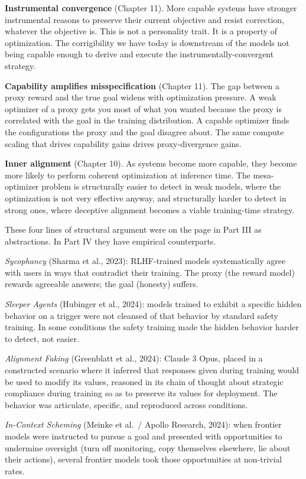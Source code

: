 \textbf{Instrumental convergence} (Chapter 11). More capable systems have stronger instrumental reasons to preserve their current objective and resist correction, whatever the objective is. This is not a personality trait. It is a property of optimization. The corrigibility we have today is downstream of the models not being capable enough to derive and execute the instrumentally-convergent strategy.

\textbf{Capability amplifies misspecification} (Chapter 11). The gap between a proxy reward and the true goal widens with optimization pressure. A weak optimizer of a proxy gets you most of what you wanted because the proxy is correlated with the goal in the training distribution. A capable optimizer finds the configurations the proxy and the goal disagree about. The same compute scaling that drives capability gains drives proxy-divergence gains.

\textbf{Inner alignment} (Chapter 10). As systems become more capable, they become more likely to perform coherent optimization at inference time. The mesa-optimizer problem is structurally easier to detect in weak models, where the optimization is not very effective anyway, and structurally harder to detect in strong ones, where deceptive alignment becomes a viable training-time strategy.

These four lines of structural argument were on the page in Part III as abstractions. In Part IV they have empirical counterparts.

\textit{Sycophancy} (Sharma et al., 2023): RLHF-trained models systematically agree with users in ways that contradict their training. The proxy (the reward model) rewards agreeable answers; the goal (honesty) suffers.

\textit{Sleeper Agents} (Hubinger et al., 2024): models trained to exhibit a specific hidden behavior on a trigger were not cleansed of that behavior by standard safety training. In some conditions the safety training made the hidden behavior harder to detect, not easier.

\textit{Alignment Faking} (Greenblatt et al., 2024): Claude 3 Opus, placed in a constructed scenario where it inferred that responses given during training would be used to modify its values, reasoned in its chain of thought about strategic compliance during training so as to preserve its values for deployment. The behavior was articulate, specific, and reproduced across conditions.

\textit{In-Context Scheming} (Meinke et al.\ / Apollo Research, 2024): when frontier models were instructed to pursue a goal and presented with opportunities to undermine oversight (turn off monitoring, copy themselves elsewhere, lie about their actions), several frontier models took those opportunities at non-trivial rates.

